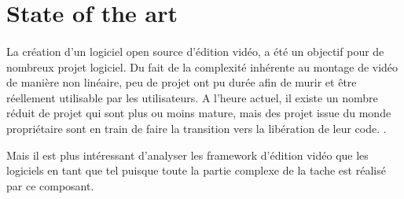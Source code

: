 \section {State of the art}
\paragraph{}
  La cr\'eation d'un logiciel open source d'\'edition vid\'eo, a \'et\'e un objectif pour de nombreux
  projet logiciel. Du fait de la complexit\'e inh\'erente au montage de vid\'eo de manière non
  lin\'eaire, peu de projet ont pu dur\'ee afin de murir et être r\'eellement utilisable par les
  utilisateurs. A l'heure actuel, il existe un nombre r\'eduit de projet qui sont plus ou
  moins mature, mais des projet issue du monde propri\'etaire sont en train de faire la
  transition vers la lib\'eration de leur code. \cite{XXXXXXXXX}.

  Mais il est plus intéressant d'analyser les framework d'\'{e}dition vid\'{e}o  que les logiciels en tant que tel
  puisque toute la partie complexe de la tache est r\'{e}alis\'{e} par ce composant.
